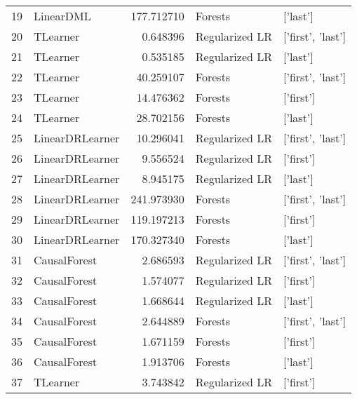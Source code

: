 \begin{tabular}{llrll}
19 &                            LinearDML &    177.712710 &         Forests &           ['last'] \\
20 &                             TLearner &      0.648396 &  Regularized LR &  ['first', 'last'] \\
21 &                             TLearner &      0.535185 &  Regularized LR &           ['last'] \\
22 &                             TLearner &     40.259107 &         Forests &  ['first', 'last'] \\
23 &                             TLearner &     14.476362 &         Forests &          ['first'] \\
24 &                             TLearner &     28.702156 &         Forests &           ['last'] \\
25 &                      LinearDRLearner &     10.296041 &  Regularized LR &  ['first', 'last'] \\
26 &                      LinearDRLearner &      9.556524 &  Regularized LR &          ['first'] \\
27 &                      LinearDRLearner &      8.945175 &  Regularized LR &           ['last'] \\
28 &                      LinearDRLearner &    241.973930 &         Forests &  ['first', 'last'] \\
29 &                      LinearDRLearner &    119.197213 &         Forests &          ['first'] \\
30 &                      LinearDRLearner &    170.327340 &         Forests &           ['last'] \\
31 &                         CausalForest &      2.686593 &  Regularized LR &  ['first', 'last'] \\
32 &                         CausalForest &      1.574077 &  Regularized LR &          ['first'] \\
33 &                         CausalForest &      1.668644 &  Regularized LR &           ['last'] \\
34 &                         CausalForest &      2.644889 &         Forests &  ['first', 'last'] \\
35 &                         CausalForest &      1.671159 &         Forests &          ['first'] \\
36 &                         CausalForest &      1.913706 &         Forests &           ['last'] \\
37 &                             TLearner &      3.743842 &  Regularized LR &          ['first'] \\
\bottomrule
\end{tabular}
